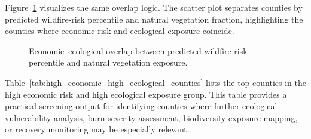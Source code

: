 \begin{table}[htbp]
\centering
\caption{Economic--ecological risk-overlap quadrant summary.}
\label{tab:economic_ecological_quadrant_summary}
\scriptsize
\setlength{\tabcolsep}{3pt}
\renewcommand{\arraystretch}{1.15}
\end{table}

Figure~\ref{fig:economic_ecological_quadrant_scatter} visualizes the same overlap logic. The scatter plot separates counties by predicted wildfire-risk percentile and natural vegetation fraction, highlighting the counties where economic risk and ecological exposure coincide.

\begin{figure}[htbp]
    \centering
    \caption{Economic--ecological overlap between predicted wildfire-risk percentile and natural vegetation exposure.}
    \label{fig:economic_ecological_quadrant_scatter}
\end{figure}

Table~\ref{tab:high_economic_high_ecological_counties} lists the top counties in the high economic risk and high ecological exposure group. This table provides a practical screening output for identifying counties where further ecological vulnerability analysis, burn-severity assessment, biodiversity exposure mapping, or recovery monitoring may be especially relevant.


